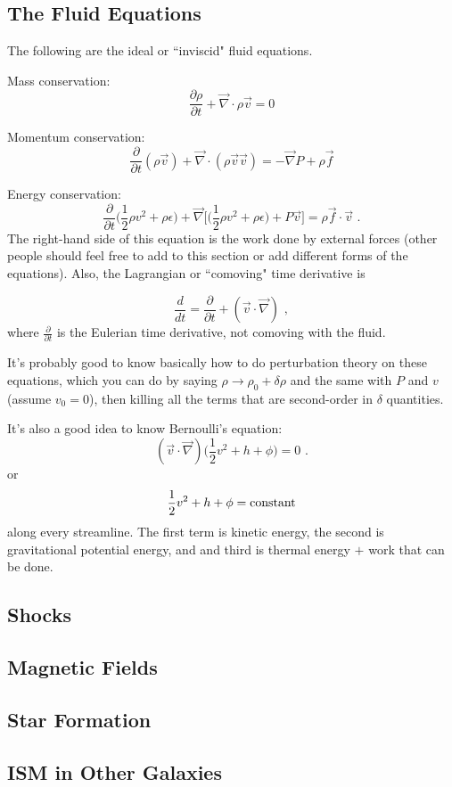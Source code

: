\subsection{The Fluid Equations}
The following are the ideal or ``inviscid" fluid equations.

Mass conservation:
\begin{equation}
\frac{\partial \rho}{\partial t} + \vec{\nabla} \cdot \rho \vec{v} = 0
\end{equation}

Momentum conservation:
\begin{equation}
\frac{\partial}{\partial t} (\rho \vec{v}) + \vec{\nabla}\cdot (\rho \vec{v} \vec{v}) = -\vec{\nabla} P + \rho \vec{f}
\end{equation}

Energy conservation:
\begin{equation}
\frac{\partial}{\partial t} \biggl( \frac{1}{2} \rho v^2 + \rho \epsilon \biggr) + \vec{\nabla}\biggl[\biggl(\frac{1}{2}\rho v^2 + \rho \epsilon \biggr) + P \vec{v} \biggr] = \rho \vec{f} \cdot \vec{v}\,\,.
\end{equation}
The right-hand side of this equation is the work done by external forces (other people should feel free to add to this section or add different forms of the equations). Also, the Lagrangian or ``comoving" time derivative is

\begin{equation}
\frac{d}{dt} = \frac{\partial}{\partial t} + (\vec{v} \cdot \vec{\nabla})\,\, ,
\end{equation}
where $\frac{\partial}{\partial t}$ is the Eulerian time derivative, not comoving with the fluid.

It's probably good to know basically how to do perturbation theory on these equations, which you can do by saying $\rho \rightarrow \rho_0 + \delta \rho$ and the same with $P$ and $v$ (assume $v_0 = 0$), then killing all the terms that are second-order in $\delta$ quantities.

It's also a good idea to know Bernoulli's equation:
\begin{equation}
(\vec{v}\cdot \vec{\nabla})\biggl(\frac{1}{2} v^2 + h + \phi \biggr) = 0\,\, .
\end{equation}
or
\begin{equation}
\frac{1}{2} v^2 + h + \phi = {\rm constant}
\end{equation}
along every streamline. The first term is kinetic energy, the second is gravitational potential energy, and and third is thermal energy $+$ work that can be done.

\subsection{Shocks}

\subsection{Magnetic Fields}

\subsection{Star Formation}

\subsection{ISM in Other Galaxies}
